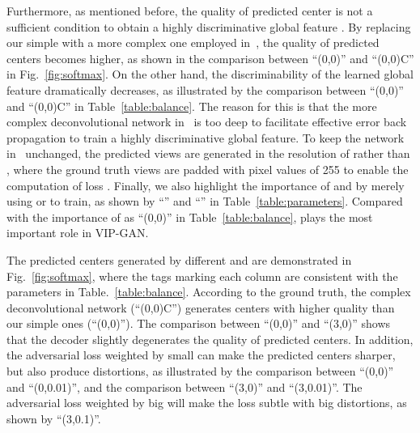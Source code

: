 \documentclass[letterpaper]{article} \usepackage{aaai19}  \usepackage{times}  \usepackage{helvet}  \usepackage{courier}  \usepackage{url}  \usepackage{graphicx}
\begin{document}
Furthermore, as mentioned before, the quality of predicted center  is not a sufficient condition to obtain a highly discriminative global feature . By replacing our simple  with a more complex one employed in~\cite{NIPS2016_6158}, the quality of predicted centers becomes higher, as shown in the comparison between ``(0,0)'' and ``(0,0)C'' in Fig.~\ref{fig:softmax}. On the other hand, the discriminability of the learned global feature  dramatically decreases, as illustrated by the comparison between ``(0,0)'' and ``(0,0)C'' in Table~\ref{table:balance}. The reason for this is that the more complex deconvolutional network in~\cite{NIPS2016_6158} is too deep to facilitate effective error back propagation to train a highly discriminative global feature. To keep the network in~\cite{NIPS2016_6158} unchanged, the predicted views are generated in the resolution of  rather than , where the  ground truth views are padded with pixel values of 255 to enable the computation of loss . Finally, we also highlight the importance of  and  by merely using  or  to train, as shown by ``'' and ``'' in Table~\ref{table:parameters}. Compared with the importance of  as ``(0,0)'' in Table~\ref{table:balance},  plays the most important role in VIP-GAN.

The predicted centers  generated by different  and  are demonstrated in Fig.~\ref{fig:softmax}, where the tags marking each column are consistent with the parameters in Table.~\ref{table:balance}. According to the ground truth, the complex deconvolutional network (``(0,0)C'') generates centers with higher quality than our simple ones (``(0,0)''). The comparison between ``(0,0)'' and ``(3,0)'' shows that the decoder  slightly degenerates the quality of predicted centers. In addition, the adversarial loss weighted by small  can make the predicted centers sharper, but also produce distortions, as illustrated by the comparison between ``(0,0)'' and ``(0,0.01)'', and the comparison between ``(3,0)'' and ``(3,0.01)''. The adversarial loss weighted by big  will make the loss  subtle with big distortions, as shown by ``(3,0.1)''.
\end{document}
